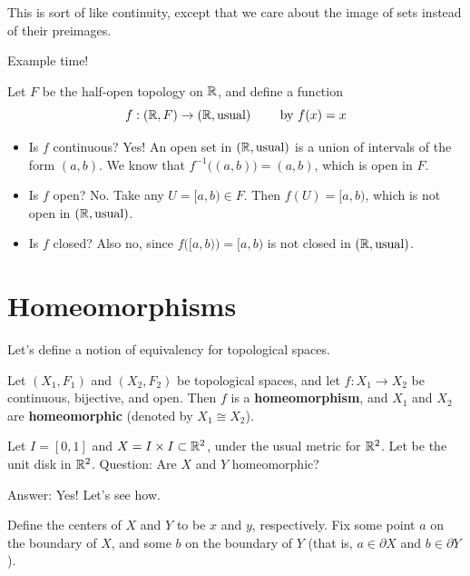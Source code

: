 This is sort of like continuity, except that we care about the image of sets instead of their preimages.

Example time! 
\begin{example}
	Let $F$ be the half-open topology on $\mathbb R$, and define a function
	\[{f:(\mathbb R,F)\to(\mathbb R,\text{usual})}\qquad\text{ by }f(x) = x\]
\end{example}
\begin{itemize}
	\item Is $f$ continuous? Yes! An open set in $(\mathbb R, \text{usual})$ is a union of intervals of the form $(a,b)$. We know that $f^{-1}\big((a,b)\big) = (a,b)$, which is open in $F$. 
	\item Is $f$ open? No. Take any $U = [a,b) \in F$. Then $f(U) = [a,b)$, which is not open in $(\mathbb R, \text{usual})$. 
	\item Is $f$ closed? Also no, since $f\big([a,b)\big) = [a,b)$ is not closed in $(\mathbb R, \text{usual})$. 
\end{itemize}

\section{Homeomorphisms} Let's define a notion of equivalency for topological spaces. 
\begin{definition}
	Let $(X_1,F_1)$ and $(X_2,F_2)$ be topological spaces, and let $f:X_1\to X_2$ be continuous, bijective, and open. Then $f$ is a \textbf{homeomorphism}, and $X_1$ and $X_2$ are \textbf{homeomorphic} (denoted by $X_1 \cong X_2$). 
\end{definition}
\begin{example}
	Let $I = [0,1]$ and $X = I\times I\subset\mathbb R^2$, under the usual metric for $\mathbb R^2$. Let  be the unit disk in $\mathbb R^2$. Question: Are $X$ and $Y$ homeomorphic? 
	
	Answer: Yes! Let's see how. 
\end{example}

Define the centers of $X$ and $Y$ to be $x$ and $y$, respectively. Fix some point $a$ on the boundary of $X$, and some $b$ on the boundary of $Y$ (that is, $a\in 
\partial X$ and $b\in
\partial Y$).

